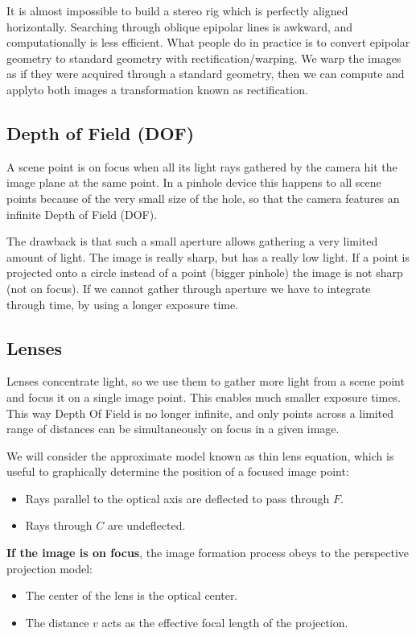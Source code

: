 \documentclass{article}
\begin{document}
It is almost impossible to build a stereo rig which is perfectly aligned horizontally.
Searching through oblique epipolar lines is awkward, and computationally is less efficient.
What people do in practice is to convert epipolar geometry to standard geometry with rectification/warping.
We warp the images as if they were acquired through a standard geometry, then we can compute and applyto both images a transformation known as rectification.

\subsection{Depth of Field (DOF)}

A scene point is on focus when all its light rays gathered by the camera hit the image plane at the same point.
In a pinhole device this happens to all scene points because of the very small size of the hole, so that the camera features an infinite Depth of Field (DOF).

The drawback is that such a small aperture allows gathering a very limited amount of light.
The image is really sharp, but has a really low light.
If a point is projected onto a circle instead of a point (bigger pinhole) the image is not sharp (not on focus).
If we cannot gather through aperture we have to integrate through time, by using a longer exposure time.

\subsection{Lenses}

Lenses concentrate light, so we use them to gather more light from a scene point and focus it on a single image point.
This enables much smaller exposure times.
This way Depth Of Field is no longer infinite, and only points across a limited range of distances can be simultaneously on focus in a given image.


We will consider the approximate model known as thin lens equation, which is useful to graphically determine the position of a focused image point:
\begin{itemize}
  \item Rays parallel to the optical axis are deflected to pass through $F$.
  \item Rays through $C$ are undeflected.
\end{itemize}

\textbf{If the image is on focus}, the image formation process obeys to the perspective projection model:
\begin{itemize}
  \item The center of the lens is the optical center.
  \item The distance $v$ acts as the effective focal length of the projection.
\end{itemize}
\end{document}
